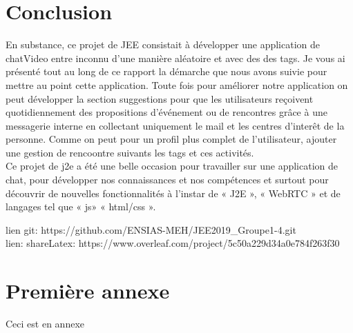 \documentclass[oneside,12pt,a4paper]{book}
\begin{document}
\chapter{ Conclusion}
En substance, ce projet de JEE consistait à développer une application de chatVideo entre inconnu d'une manière aléatoire et avec des des tags. Je vous ai présenté tout au long de ce rapport la démarche que nous avons suivie pour mettre au point cette application. Toute fois pour améliorer notre application on peut développer la section suggestions pour que les utilisateurs reçoivent quotidiennement des propositions d’événement ou de rencontres grâce à une messagerie interne en collectant uniquement le mail et les centres d'interêt de la personne. Comme on peut pour un profil plus complet de l’utilisateur, ajouter une gestion de rencoontre suivants les tags et ces activités.\\
Ce projet de j2e a été une belle occasion pour travailler sur une application de chat, pour développer nos connaissances et nos compétences et surtout pour découvrir de nouvelles fonctionnalités à l’instar de « J2E », « WebRTC » et de langages tel que « js» « html/css ».



\newpage
{}
\pagestyle{plain}
lien git: https://github.com/ENSIAS-MEH/JEE2019_Groupe1-4.git \\
lien: shareLatex: https://www.overleaf.com/project/5c50a229d34a0e784f263f30 \\
\thispagestyle{plain}
\pagestyle{fancy}

\appendix
\chapter{Première annexe}
\setcounter{page}{1}

Ceci est en annexe
\end{document}
